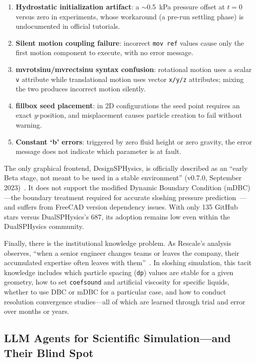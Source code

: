 \documentclass[11pt]{article}
\begin{document}
\begin{enumerate}[noitemsep]
  \item \textbf{Hydrostatic initialization artifact}: a {$\sim$}0.5~kPa pressure offset at $t{=}0$ versus zero in experiments, whose workaround (a pre-run settling phase) is undocumented in official tutorials.
  \item \textbf{Silent motion coupling failure}: incorrect \texttt{mov ref} values cause only the first motion component to execute, with no error message.
  \item \textbf{mvrotsinu/mvrectsinu syntax confusion}: rotational motion uses a scalar \texttt{v} attribute while translational motion uses vector \texttt{x/y/z} attributes; mixing the two produces incorrect motion silently.
  \item \textbf{fillbox seed placement}: in 2D configurations the seed point requires an exact $y$-position, and misplacement causes particle creation to fail without warning.
  \item \textbf{Constant `b' errors}: triggered by zero fluid height or zero gravity, the error message does not indicate which parameter is at fault.
\end{enumerate}

The only graphical frontend, DesignSPHysics, is officially described as an ``early Beta stage, not meant to be used in a stable environment'' (v0.7.0, September 2023)~\citep{vieira2017designsphysics}. It does not support the modified Dynamic Boundary Condition (mDBC)---the boundary treatment required for accurate sloshing pressure prediction~\citep{english2021mdbc}---and suffers from FreeCAD version dependency issues. With only 135 GitHub stars versus DualSPHysics's 687, its adoption remains low even within the DualSPHysics community.

Finally, there is the institutional knowledge problem. As Rescale's analysis observes, ``when a senior engineer changes teams or leaves the company, their accumulated expertise often leaves with them''~\citep{rescale2025}. In sloshing simulation, this tacit knowledge includes which particle spacing (\texttt{dp}) values are stable for a given geometry, how to set \texttt{coefsound} and artificial viscosity for specific liquids, whether to use DBC or mDBC for a particular case, and how to conduct resolution convergence studies---all of which are learned through trial and error over months or years.

\subsection{LLM Agents for Scientific Simulation---and Their Blind Spot}
\end{document}
